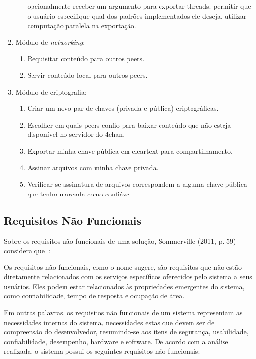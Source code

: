 \begin{enumerate}
\begin{enumerate}[label*=\arabic*.]
            \subitem opcionalmente receber um argumento para exportar threads.
            \subitem permitir que o usuário especifique qual dos padrões implementados ele deseja.
            \subitem utilizar computação paralela na exportação.
    \end{enumerate}
    \item Módulo de \textit{networking}:
    \begin{enumerate}[label*=\arabic*.]
        \item Requisitar conteúdo para outros peers.
        \item Servir conteúdo local para outros peers.
    \end{enumerate}
    \item Módulo de criptografia:
    \begin{enumerate}[label*=\arabic*.]
        \item Criar um novo par de chaves (privada e pública) criptográficas.
        \item Escolher em quais peers confio para baixar conteúdo que não esteja disponível no servidor do 4chan.
        \item Exportar minha chave pública em cleartext para compartilhamento.
        \item Assinar arquivos com minha chave privada.
        \item Verificar se assinatura de arquivos correspondem a alguma chave pública que tenho marcada como confiável.
    \end{enumerate}
\end{enumerate}

\subsection{Requisitos Não Funcionais}

Sobre os requisitos não funcionais de uma solução, Sommerville (2011, p. 59) considera que~\cite{SOMMERVILLE1}:

\begin{directcite}
Os requisitos não funcionais, como o nome sugere, são requisitos
que não estão diretamente relacionados com os serviços específicos
oferecidos pelo sistema a seus usuários.
Eles podem estar
relacionados às propriedades emergentes do sistema, como
confiabilidade, tempo de resposta e ocupação de área.
\end{directcite}

Em outras palavras, os requisitos não funcionais de um sistema representam as necessidades internas do sistema, necessidades estas que devem ser de compreensão do desenvolvedor, resumindo-se aos itens de segurança, usabilidade, confiabilidade, desempenho, hardware e software.
De acordo com a análise realizada, o sistema possui os seguintes requisitos não funcionais:

